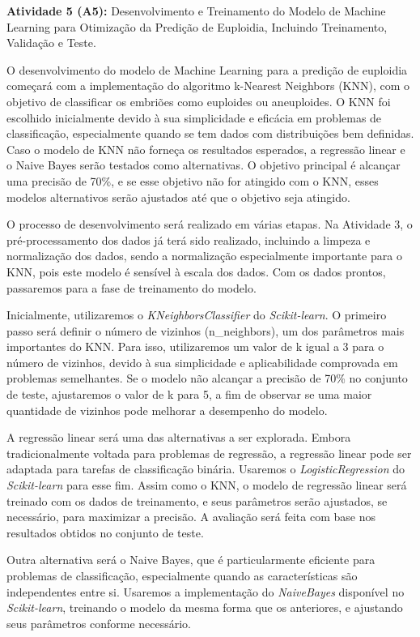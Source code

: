 \textbf{Atividade 5 (A5):} Desenvolvimento e Treinamento do Modelo de Machine Learning para Otimização da Predição de Euploidia, Incluindo Treinamento, Validação e Teste.

O desenvolvimento do modelo de Machine Learning para a predição de euploidia começará com a implementação do algoritmo k-Nearest Neighbors (KNN), com o objetivo de classificar os embriões como euploides ou aneuploides. O KNN foi escolhido inicialmente devido à sua simplicidade e eficácia em problemas de classificação, especialmente quando se tem dados com distribuições bem definidas. Caso o modelo de KNN não forneça os resultados esperados, a regressão linear e o Naive Bayes serão testados como alternativas. O objetivo principal é alcançar uma precisão de 70\%, e se esse objetivo não for atingido com o KNN, esses modelos alternativos serão ajustados até que o objetivo seja atingido.

O processo de desenvolvimento será realizado em várias etapas. Na Atividade 3, o pré-processamento dos dados já terá sido realizado, incluindo a limpeza e normalização dos dados, sendo a normalização especialmente importante para o KNN, pois este modelo é sensível à escala dos dados. Com os dados prontos, passaremos para a fase de treinamento do modelo.

Inicialmente, utilizaremos o \textit{KNeighborsClassifier} do \textit{Scikit-learn}. O primeiro passo será definir o número de vizinhos (n\_neighbors), um dos parâmetros mais importantes do KNN. Para isso,  utilizaremos um valor de 
k igual a 3 para o número de vizinhos, devido à sua simplicidade e aplicabilidade comprovada em problemas semelhantes. Se o modelo não alcançar a precisão de 70\% no conjunto de teste, ajustaremos o valor de k para 5, a fim de observar se uma maior quantidade de vizinhos pode melhorar a desempenho do modelo.

A regressão linear será uma das alternativas a ser explorada. Embora tradicionalmente voltada para problemas de regressão, a regressão linear pode ser adaptada para tarefas de classificação binária. Usaremos o \textit{LogisticRegression} do \textit{Scikit-learn} para esse fim. Assim como o KNN, o modelo de regressão linear será treinado com os dados de treinamento, e seus parâmetros serão ajustados, se necessário, para maximizar a precisão. A avaliação será feita com base nos resultados obtidos no conjunto de teste.

Outra alternativa será o Naive Bayes, que é particularmente eficiente para problemas de classificação, especialmente quando as características são independentes entre si. Usaremos a implementação do \textit{NaiveBayes} disponível no \textit{Scikit-learn}, treinando o modelo da mesma forma que os anteriores, e ajustando seus parâmetros conforme necessário.

